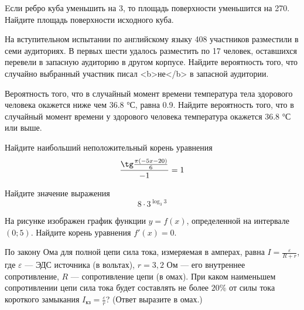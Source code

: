 \documentclass[twocolumn]{article}
\begin{document}
\begin{taskBN}{2}
Eсли ребро куба уменьшить на 3, то площадь поверхности уменьшится на 270. Найдите площадь поверхности исходного куба.\vspace{2.5cm}
\end{taskBN}

\begin{taskBN}{3}
На вступительном испытании по английскому языку 408 участников разместили в семи аудиториях. В первых шести удалось разместить по 17 человек, оставшихся перевели в запасную аудиторию в другом корпусе. Найдите вероятность того, что случайно выбранный участник писал <b>не</b> в запасной аудитории.
\end{taskBN}

\begin{taskBN}{4}
Вероятность того, что в случайный момент времени температура тела здорового человека окажется ниже чем 36.8 °С, равна 0.9. Найдите вероятность того, что в случайный момент времени у здорового человека температура окажется 36.8 °С или выше.
\end{taskBN}

\begin{taskBN}{5}
Найдите наибольший неположительный корень уравнения $$\frac{\tg\frac{\pi(-5x -20)}{6}}{-1}=1$$
\end{taskBN}

\begin{taskBN}{6}
Найдите значение выражения $$8\cdot {3}^{\log_{3}{3}} $$
\end{taskBN}

\begin{taskBN}{7}
На рисунке изображен график функции $y = f(x)$, определенной на интервале $(0; 5)$. Найдите корень уравнения $f'(x)=0$.\vspace{2.5cm}
\end{taskBN}

\begin{taskBN}{8}
По закону Ома для полной цепи сила тока, измеряемая в амперах, равна $I=\frac{\varepsilon}{R+r}$, где $\varepsilon$ — ЭДС источника (в вольтах), $r= 3{,}2 $ Ом — его внутреннее сопротивление, $R$ — сопротивление цепи (в омах). При каком наименьшем сопротивлении цепи сила тока будет составлять не более $20\%$ от силы тока короткого замыкания $I_{\mbox{кз}}=\frac{\varepsilon}{r}$? (Ответ выразите в омах.)
\end{taskBN}
\end{document}

